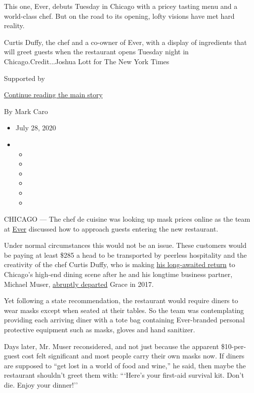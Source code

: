 This one, Ever, debuts Tuesday in Chicago with a pricey tasting menu and
a world-class chef. But on the road to its opening, lofty visions have
met hard reality.

Curtis Duffy, the chef and a co-owner of Ever, with a display of
ingredients that will greet guests when the restaurant opens Tuesday
night in Chicago.Credit...Joshua Lott for The New York Times

Supported by

\protect\hyperlink{after-sponsor}{Continue reading the main story}

By Mark Caro

\begin{itemize}
\item
  July 28, 2020
\item
  \begin{itemize}
  \item
  \item
  \item
  \item
  \item
  \item
  \end{itemize}
\end{itemize}

CHICAGO --- The chef de cuisine was looking up mask prices online as the
team at \href{https://www.ever-restaurant.com/}{Ever} discussed how to
approach guests entering the new restaurant.

Under normal circumstances this would not be an issue. These customers
would be paying at least \$285 a head to be transported by peerless
hospitality and the creativity of the chef Curtis Duffy, who is making
\href{https://www.nytimes3xbfgragh.onion/2019/06/24/dining/ever-restaurant-chicago-curtis-duffy.html}{his
long-awaited return} to Chicago's high-end dining scene after he and his
longtime business partner, Michael Muser,
\href{https://www.nytimes3xbfgragh.onion/2017/12/20/dining/grace-chicago-chefs-quit.html}{abruptly
departed} Grace in 2017.

Yet following a state recommendation, the restaurant would require
diners to wear masks except when seated at their tables. So the team was
contemplating providing each arriving diner with a tote bag containing
Ever-branded personal protective equipment such as masks, gloves and
hand sanitizer.

Days later, Mr. Muser reconsidered, and not just because the apparent
\$10-per-guest cost felt significant and most people carry their own
masks now. If diners are supposed to ``get lost in a world of food and
wine,'' he said, then maybe the restaurant shouldn't greet them with:
```Here's your first-aid survival kit. Don't die. Enjoy your dinner!''

